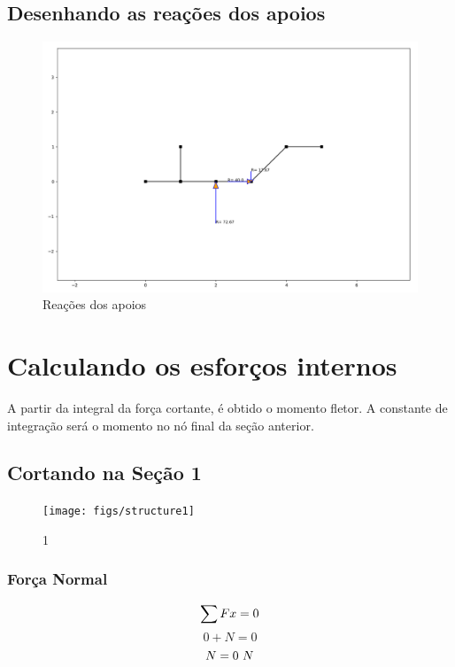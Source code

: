 \documentclass[a4paper,12pt]{article}%
\begin{document}
%
\subsection{Desenhando as reações dos apoios}%
\label{subsec:Desenhandoasreaesdosapoios}%


\begin{figure}[H]%
\centering%
\includegraphics[width=500px]{figs/supports}%
\caption{\label{fig:apoios} Reações dos apoios}%
\end{figure}

%
\section{Calculando os esforços internos}%
\label{sec:Calculandoosesforosinternos}%
A partir da integral da força cortante, é obtido o momento fletor.%
\linebreak%
A constante de integração será o momento no nó final da seção anterior.%
\linebreak%
\subsection{Cortando na Seção 1}%
\label{subsec:CortandonaSeo1}%


\begin{figure}[H]%
\centering%
\texttt{[image: figs/structure1]}%
\caption{\label{fig:secoes}\label{fig:secoes} 1}%
\end{figure}

%
\subsubsection{Força Normal}%
\label{ssubsec:ForaNormal}%
\begin{dmath*}%
\sum{Fx} = 0 \\%
\end{dmath*}%
\begin{dmath*}%
0 + N = 0%
\end{dmath*}%
\begin{dmath*}%
N = 0$ $N%
\end{dmath*}
\end{document}
